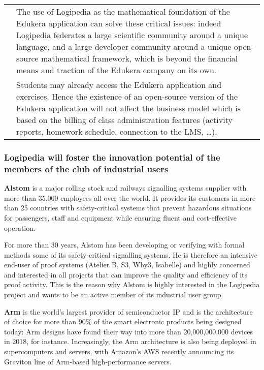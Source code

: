 \begin{longtable}{|p{}|p{}|}
&
\hspace{0.4cm} The use of Logipedia as the mathematical foundation of
the Edukera application can solve these critical issues: indeed
Logipedia federates a large scientific community around a unique
language, and a large developer community around a unique open-source
mathematical framework, which is beyond the financial means and
traction of the Edukera company on its own.  \\

&
\hspace{0.4cm} Students may already access the Edukera application and
exercises. Hence the existence of an open-source version of the
Edukera application will not affect the business model which is based
on the billing of class administration features (activity reports,
homework schedule, connection to the LMS, \ldots).  \\ \hline
\end{longtable}

\subsubsection*{Logipedia will foster the innovation potential of the 
members of the club of industrial users}

{\bf Alstom} is a major rolling stock and railways signalling systems
supplier with more than 35,000 employees all over the world. It
provides its customers in more than 25 countries with safety-critical
systems that prevent hazardous situations for passengers, staff and
equipment while ensuring fluent and cost-effective operation.

For more than 30 years, Alstom has been developing or verifying with
formal methods some of its safety-critical signalling systems. He is
therefore an intensive end-user of proof systems (Atelier B, S3, Why3,
Isabelle) and highly concerned and interested in all projects that can
improve the quality and efficiency of its proof activity. This is the
reason why Alstom is highly interested in the Logipedia project and
wants to be an active member of its industrial user group.

{\bf Arm} is the world's largest provider of semiconductor IP and
is the architecture of choice for more than 90\% of the smart
electronic products being designed today: Arm designs have found their
way into more than 20,000,000,000 devices in 2018, for instance.
Increasingly, the Arm architecture is also being deployed in
supercomputers and servers, with Amazon’s AWS recently announcing its
Graviton line of Arm-based high-performance servers.

